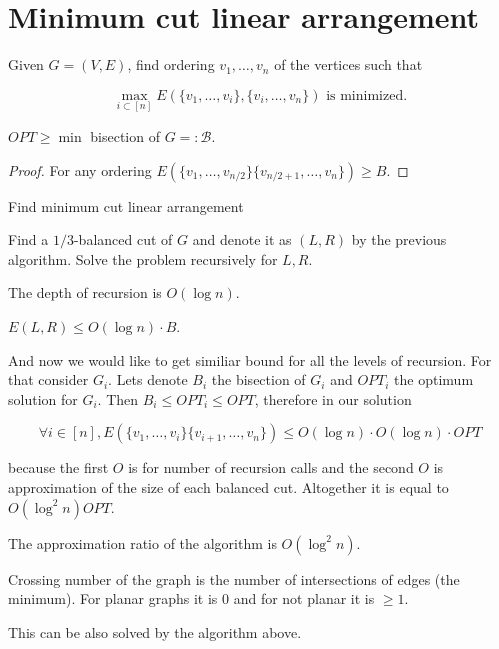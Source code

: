 \section{Minimum cut linear arrangement}

Given $G = (V,E)$, find ordering $v_1, \dots, v_n$ of the vertices such that

$$
\max_{i \subset [n]} E(\{v_{1}, \dots, v_{i}\}, \{v_{i}, \dots, v_{n}\}) \text{ is minimized.}
$$

\begin{observ}
	$OPT \geq \min$ bisection of $G = : \mathcal{B}$.
\end{observ}

\begin{proof}
	For any ordering $E(\{v_{1}, \dots, v_{n/2}\} \{v_{n/2 +1}, \dots, v_{n}\}) \geq B$.
\end{proof}

\begin{algorithm}
	\caption{Find minimum cut linear arrangement}
	\begin{algorithmic}[1]
		\State Find a $1/3$-balanced cut of $G$ and denote it as $(L,R)$ by the previous algorithm.
		\State Solve the problem recursively for $L,R$.
	\end{algorithmic}
\end{algorithm}

\begin{observ}
	The depth of recursion is $O(\log n)$.
\end{observ}

\begin{observ}
	$E(L,R) \leq O (\log n) \cdot B$.
\end{observ}

And now we would like to get similiar bound for all the levels of recursion. For that consider $G_{i}$. Lets denote $B_{i}$ the bisection of $G_{i}$ and $OPT_{i}$ the optimum solution for $G_{i}$. Then $B_{i} \leq OPT_{i} \leq OPT$, therefore in our solution

$$
\forall i \in [n], E(\{v_{1}, \dots, v_{i}\} \{v_{i+1}, \dots, v_{n}\}) \leq O(\log n) \cdot O(\log n) \cdot OPT
$$

because the first $O$ is for number of recursion calls and the second $O$ is approximation of the size of each balanced cut. Altogether it is equal to $O(\log^2 n) OPT$.

\begin{thm}
	The approximation ratio of the algorithm is $O(\log^2 n)$.
\end{thm}

\begin{defn}
	Crossing number of the graph is the number of intersections of edges (the minimum). For planar graphs it is 0 and for not planar it is $\geq 1$.
\end{defn}

This can be also solved by the algorithm above.

